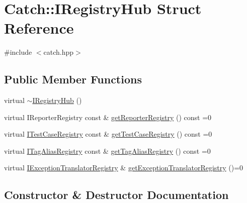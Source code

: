 \hypertarget{struct_catch_1_1_i_registry_hub}{}\section{Catch\+:\+:I\+Registry\+Hub Struct Reference}
\label{struct_catch_1_1_i_registry_hub}


{\ttfamily \#include $<$catch.\+hpp$>$}

\subsection*{Public Member Functions}
\begin{DoxyCompactItemize}
\item 
virtual \mbox{\hyperlink{struct_catch_1_1_i_registry_hub_a050de0f27f96888c8b410992146c9a09}{$\sim$\+I\+Registry\+Hub}} ()
\item 
virtual I\+Reporter\+Registry const  \& \mbox{\hyperlink{struct_catch_1_1_i_registry_hub_a55534563f7ecf7e20ec1e37285ebe54d}{get\+Reporter\+Registry}} () const =0
\item 
virtual \mbox{\hyperlink{struct_catch_1_1_i_test_case_registry}{I\+Test\+Case\+Registry}} const  \& \mbox{\hyperlink{struct_catch_1_1_i_registry_hub_af4f6255f0c0f8f1f179fa9d7d4843076}{get\+Test\+Case\+Registry}} () const =0
\item 
virtual \mbox{\hyperlink{struct_catch_1_1_i_tag_alias_registry}{I\+Tag\+Alias\+Registry}} const  \& \mbox{\hyperlink{struct_catch_1_1_i_registry_hub_a3c511b1d33e5a6d95c333a0ff387df1a}{get\+Tag\+Alias\+Registry}} () const =0
\item 
virtual \mbox{\hyperlink{struct_catch_1_1_i_exception_translator_registry}{I\+Exception\+Translator\+Registry}} \& \mbox{\hyperlink{struct_catch_1_1_i_registry_hub_a3606988da110c016c5af3ae63454eb78}{get\+Exception\+Translator\+Registry}} ()=0
\end{DoxyCompactItemize}


\subsection{Constructor \& Destructor Documentation}
\mbox{\label{struct_catch_1_1_i_registry_hub_a050de0f27f96888c8b410992146c9a09}} 
